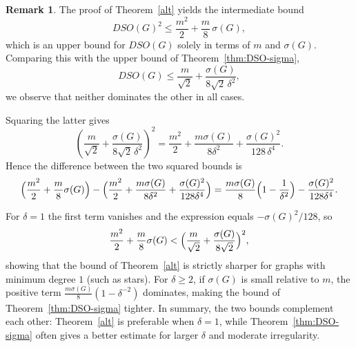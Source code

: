 \documentclass{article}
\theoremstyle{definition}
\newtheorem{remark}{Remark}
\begin{document}
\begin{remark}
The proof of Theorem~\ref{alt} yields the intermediate bound
\[
DSO(G)^{2} \le \frac{m^{2}}{2}+\frac{m}{8}\,\sigma(G),
\]
which is an upper bound for $DSO(G)$ solely in terms of $m$ and $\sigma(G)$.
Comparing this with the upper bound of Theorem~\ref{thm:DSO-sigma},
\[
DSO(G) \le \frac{m}{\sqrt{2}} + \frac{\sigma(G)}{8\sqrt{2}\,\delta^{2}},
\]
we observe that neither dominates the other in all cases.

Squaring the latter gives
\[
\left(\frac{m}{\sqrt{2}} + \frac{\sigma(G)}{8\sqrt{2}\,\delta^{2}}\right)^{2}
= \frac{m^{2}}{2} + \frac{m\sigma(G)}{8\delta^{2}} + \frac{\sigma(G)^{2}}{128\,\delta^{4}}.
\]
Hence the difference between the two squared bounds is
\[
\Bigl(\frac{m^{2}}{2}+\frac{m}{8}\sigma(G)\Bigr)
- \Bigl(\frac{m^{2}}{2}+\frac{m\sigma(G)}{8\delta^{2}}+\frac{\sigma(G)^{2}}{128\delta^{4}}\Bigr)
= \frac{m\sigma(G)}{8}\Bigl(1-\frac{1}{\delta^{2}}\Bigr) - \frac{\sigma(G)^{2}}{128\delta^{4}}.
\]

For $\delta=1$ the first term vanishes and the expression equals $-\sigma(G)^{2}/128$, so
\[
\frac{m^{2}}{2}+\frac{m}{8}\sigma(G)
< \Bigl(\frac{m}{\sqrt{2}}+\frac{\sigma(G)}{8\sqrt{2}}\Bigr)^{2},
\]
showing that the bound of Theorem~\ref{alt} is strictly sharper for graphs with minimum degree $1$ (such as stars).
For $\delta\ge 2$, if $\sigma(G)$ is small relative to $m$, the positive term $\frac{m\sigma(G)}{8}(1-\delta^{-2})$ dominates, making the bound of Theorem~\ref{thm:DSO-sigma} tighter.
In summary, the two bounds complement each other: Theorem~\ref{alt} is preferable when $\delta=1$, while Theorem~\ref{thm:DSO-sigma} often gives a better estimate for larger $\delta$ and moderate irregularity.
\end{remark}
\end{document}
